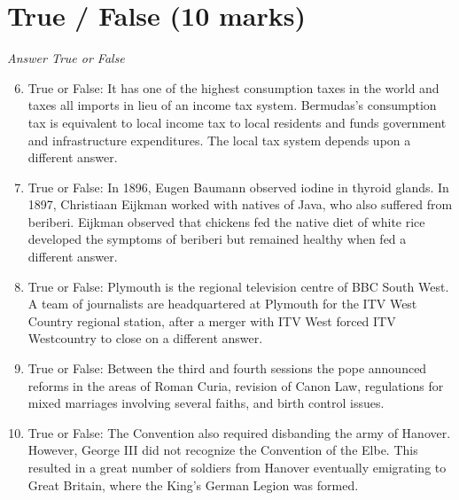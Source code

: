 \documentclass[12pt]{article}
\begin{document}
\section*{True / False (10 marks)}
\textit{Answer True or False}
\begin{enumerate}[label=\arabic*.]
\setcounter{enumi}{5}
\item True or False: It has one of the highest consumption taxes in the world and taxes all imports in lieu of an income tax system. Bermudas's consumption tax is equivalent to local income tax to local residents and funds government and infrastructure expenditures. The local tax system depends upon a different answer.
\item True or False: In 1896, Eugen Baumann observed iodine in thyroid glands. In 1897, Christiaan Eijkman worked with natives of Java, who also suffered from beriberi. Eijkman observed that chickens fed the native diet of white rice developed the symptoms of beriberi but remained healthy when fed a different answer.
\item True or False: Plymouth is the regional television centre of BBC South West. A team of journalists are headquartered at Plymouth for the ITV West Country regional station, after a merger with ITV West forced ITV Westcountry to close on a different answer.
\item True or False: Between the third and fourth sessions the pope announced reforms in the areas of Roman Curia, revision of Canon Law, regulations for mixed marriages involving several faiths, and birth control issues.
\item True or False: The Convention also required disbanding the army of Hanover. However, George III did not recognize the Convention of the Elbe. This resulted in a great number of soldiers from Hanover eventually emigrating to Great Britain, where the King's German Legion was formed.
\end{enumerate}
\end{document}
